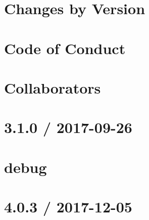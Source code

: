 \documentclass[twoside]{book}
\newcommand{\+}{\discretionary{\mbox{\scriptsize$\hookleftarrow$}}{}{}}
\begin{document}
\chapter{Changes by Version}
\label{md_dsmacc_examples_DRmerge_node_modules_electron-packager_NEWS}

\chapter{Code of Conduct}
\label{md_dsmacc_examples_DRmerge_node_modules_electron-packager_node_modules_electron-download_CODE_OF_CONDUCT}

\chapter{Collaborators}
\label{md_dsmacc_examples_DRmerge_node_modules_electron-packager_node_modules_electron-download_collaborators}

\chapter{3.1.0 / 2017-\/09-\/26}
\label{md_dsmacc_examples_DRmerge_node_modules_electron-packager_node_modules_electron-download_node_modules_debug_CHANGELOG}

\chapter{debug}
\label{md_dsmacc_examples_DRmerge_node_modules_electron-packager_node_modules_electron-download_node_modules_debug_README}

\chapter{4.0.3 / 2017-\/12-\/05}
\label{md_dsmacc_examples_DRmerge_node_modules_electron-packager_node_modules_electron-download_node_modules_fs-extra_CHANGELOG}

\end{document}

